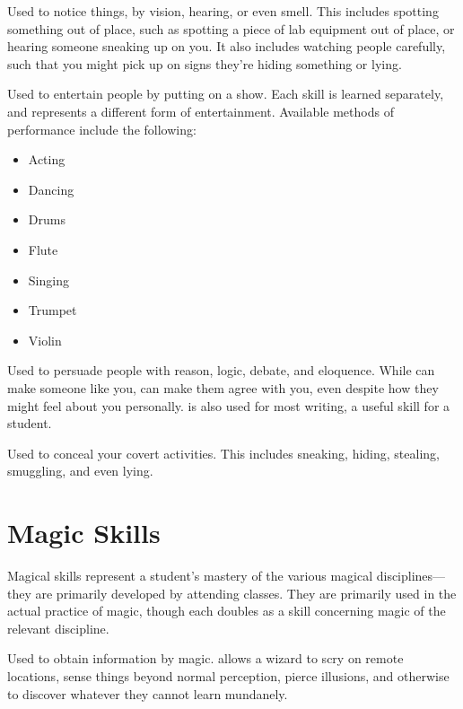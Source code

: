 
Used to notice things, by vision, hearing, or even smell.
This includes spotting something out of place, such as spotting a piece of lab equipment out of place, or hearing someone sneaking up on you.
It also includes watching people carefully, such that you might pick up on signs they're hiding something or lying.


Used to entertain people by putting on a show.
Each  skill is learned separately, and represents a different form of entertainment.
Available methods of performance include the following:
\begin{itemize}
	\item Acting
	\item Dancing
	\item Drums
	\item Flute
	\item Singing
	\item Trumpet
	\item Violin
\end{itemize}


Used to persuade people with reason, logic, debate, and eloquence.
While  can make someone like you,  can make them agree with you, even despite how they might feel about you personally.
 is also used for most writing, a useful skill for a student.


Used to conceal your covert activities.
This includes sneaking, hiding, stealing, smuggling, and even lying.

\section{Magic Skills}

Magical skills represent a student's mastery of the various magical disciplines---they are primarily developed by attending classes.
They are primarily used in the actual practice of magic, though each doubles as a  skill concerning magic of the relevant discipline.


Used to obtain information by magic.
 allows a wizard to scry on remote locations, sense things beyond normal perception, pierce illusions, and otherwise to discover whatever they cannot learn mundanely.

